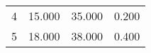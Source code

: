 % 
\begin{tabular}{cccc}
  \hline
  \hline
4 & 15.000 & 35.000 & 0.200 \\ 
  5 & 18.000 & 38.000 & 0.400 \\ 
   \hline
\end{tabular}
